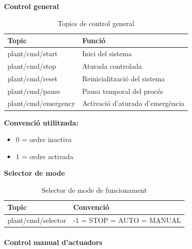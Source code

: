 \documentclass[a4paper,11pt,DIV=13,headings=normal,abstract=true,twoside=semi]{article}
\begin{document}
\textbf{Control general}

\begin{table}[H]
\centering
\small
\caption{Topics de control general}
\label{tab:mqtt_general_cmd}
\begin{tabular}{|p{5cm}|p{8cm}|}
\hline
\textbf{Topic} & \textbf{Funció} \\ \hline

plant/cmd/start & Inici del sistema \\ \hline

plant/cmd/stop & Aturada controlada \\ \hline

plant/cmd/reset & Reinicialització del sistema \\ \hline

plant/cmd/pause & Pausa temporal del procés \\ \hline

plant/cmd/emergency & Activació d'aturada d'emergència \\ \hline

\end{tabular}

\end{table}

\textbf{Convenció utilitzada:}

\begin{itemize}
\item 0 = ordre inactiva
\item 1 = ordre activada
\end{itemize}

\textbf{Selector de mode}

\begin{table}[H]
\centering
\small
\caption{Selector de mode de funcionament}
\label{tab:mqtt_selector}
\begin{tabular}{|p{5cm}|p{8cm}|}
\hline
\textbf{Topic} & \textbf{Convenció} \\ \hline

plant/cmd/selector &
-1 = STOP \newline
0 = AUTO \newline
1 = MANUAL \\ \hline

\end{tabular}

\end{table}

\paragraph{Control manual d'actuadors}
\end{document}
